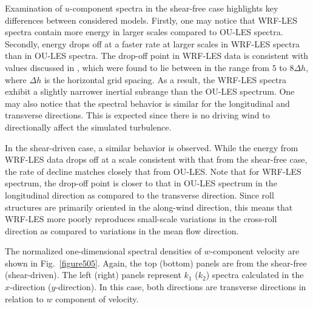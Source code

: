 Examination of $u$-component spectra in the shear-free case highlights key differences between considered models. Firstly, one may notice that WRF-LES spectra contain more energy in larger scales compared to OU-LES spectra. Secondly, energy drops off at a faster rate at larger scales in WRF-LES spectra than in OU-LES spectra. The drop-off point in WRF-LES data is consistent with values discussed in  \citet{Skamarock04}, which were found to lie between in the range from $5$ to $8 \Delta h$, where $\Delta h$ is the horizontal grid spacing. As a result, the WRF-LES spectra exhibit a slightly narrower inertial subrange than the OU-LES spectrum. One may also notice that the spectral behavior is similar for the longitudinal and transverse directions. This is expected since there is no driving wind to directionally affect the simulated turbulence.

In the shear-driven case, a similar behavior is observed. While the energy from WRF-LES data drops off at a scale consistent with that from the shear-free case, the rate of decline matches closely that from OU-LES. Note that for WRF-LES spectrum, the drop-off point is closer to that in OU-LES spectrum in the longitudinal direction as compared to the transverse direction. Since roll structures are primarily oriented in the along-wind direction, this means that WRF-LES more poorly reproduces small-scale variations in the cross-roll direction as compared to variations in the mean flow direction.

The normalized one-dimensional spectral densities of $w$-component velocity are shown in Fig.~\ref{figure505}. Again, the top (bottom) panels are from the shear-free (shear-driven). The left (right) panels represent $k_1$ ($k_2$) spectra calculated in the $x$-direction ($y$-direction). In this case, both directions are transverse directions in relation to $w$ component of velocity.


